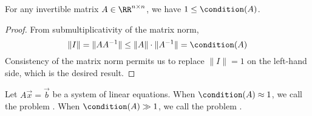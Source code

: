 \begin{proposition}
For any invertible matrix $A\in\RR^{n\times n}$, we have
$1\leq\condition(A)$.
\end{proposition}

\begin{proof}
From submultiplicativity of the matrix norm,
\begin{equation}
\|I\|=\|AA^{-1}\|\leq\|A\|\cdot\|A^{-1}\|=\condition(A)
\end{equation}
Consistency of the matrix norm permits us to replace $\|I\|=1$ on the
left-hand side, which is the desired result.
\end{proof}

\begin{definition}
Let $A\vec{x}=\vec{b}$ be a system of linear equations. When
$\condition(A)\approx 1$, we call the problem .
When $\condition(A)\gg 1$, we call the problem .
\end{definition}

